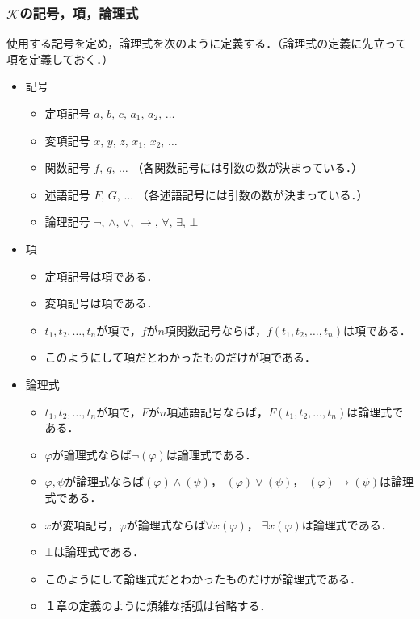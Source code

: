 \documentclass[10pt,b5paper,papersize,dvipdfmx]{jsbook}
\begin{document}
\subsubsection{$\mathcal K$の記号，項，論理式}
使用する記号を定め，論理式を次のように定義する．（論理式の定義に先立って項を定義しておく．）
\begin{itemize}
  \item 記号
    \begin{itemize}
      \item 定項記号 $a,\, b,\, c,\, a_1,\, a_2,\, \dots$
      \item 変項記号 $x,\, y,\, z,\, x_1,\, x_2,\, \dots$
      \item 関数記号 $f,\, g,\, \dots$ （各関数記号には引数の数が決まっている．）
      \item 述語記号 $F,\, G,\, \dots$ （各述語記号には引数の数が決まっている．）
      \item 論理記号 $\lnot,\, \land,\, \lor,\, \to,\, \forall,\, \exists,\, \bot$
    \end{itemize}
  \item 項
    \begin{itemize}
      \item 定項記号は項である．
      \item 変項記号は項である．
      \item $t_1,t_2,\dots,t_n$が項で，$f$が$n$項関数記号ならば，$f(t_1,t_2,\dots,t_n)$は項である．
      \item このようにして項だとわかったものだけが項である．
    \end{itemize}
  \item 論理式
    \begin{itemize}
      \item $t_1,t_2,\dots,t_n$が項で，$F$が$n$項述語記号ならば，$F(t_1,t_2,\dots,t_n)$は論理式である．
      \item $\varphi$が論理式ならば$\lnot (\varphi)$は論理式である．
      \item $\varphi,\psi$が論理式ならば$(\varphi) \land (\psi)$， $(\varphi) \lor (\psi)$， $(\varphi) \to (\psi)$は論理式である．
      \item $x$が変項記号，$\varphi$が論理式ならば$\forall x (\varphi)$， $\exists x (\varphi)$は論理式である．
      \item $\bot$は論理式である．
      \item このようにして論理式だとわかったものだけが論理式である．
      \item １章の定義のように煩雑な括弧は省略する．
    \end{itemize}
\end{itemize}
\end{document}
